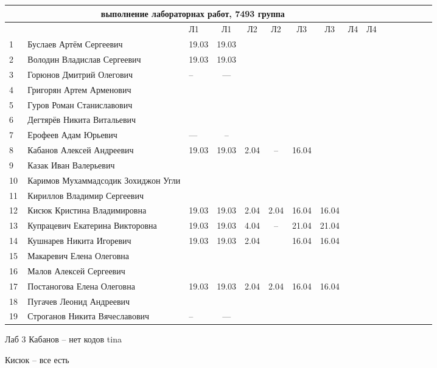 \documentclass[a4paper,11pt]{article}
\begin{document}
\newpage
%
\hspace{-2.1cm} %
\begin{tabular}{l|llccccccccccccc}
\multicolumn{10}{c}{выполнение лабораторнах работ, 7493 группа} \\
\toprule
&&Л1&Л1& Л2&Л2& Л3&Л3& Л4&Л4&\\ 
\midrule
1\,&Буслаев Артём Сергеевич               &19.03&19.03&&&&&&\\
2\,&Володин Владислав Сергеевич           &19.03&19.03&&&&&&\\
3\,&Горюнов Дмитрий Олегович              &--   &---   &&&&&&\\
4\,&Григорян Артем Арменович              &&&&&&&&\\
5\,&Гуров Роман Станиславович             &&&&&&&&\\
\midrule
6\,&Дегтярёв Никита Витальевич            &&&&&&&&\\
7\,&Ерофеев Адам Юрьевич                  &---&--&&&&&&\\
8\,&Кабанов Алексей Андреевич             &19.03&19.03&2.04&--&16.04&&&\\
9\,&Казак Иван Валерьевич                 &&&&&&&&\\
10\,&Каримов Мухаммадсодик Зохиджон Угли  &&&&&&&&\\
\midrule
11\,&Кириллов Владимир Сергеевич          &&&&&&&&\\
12\,&Кисюк Кристина Владимировна          &19.03&19.03&2.04 &2.04&16.04&16.04&&\\
13\,&Купрацевич Екатерина Викторовна      &19.03&19.03& 4.04& --  &21.04&21.04&&\\
14\,&Кушнарев Никита Игоревич             &19.03&19.03&2.04&&16.04&16.04&&\\
15\,&Макаревич Елена Олеговна             &&&&&&&&\\
\midrule
16\,&Малов Алексей Сергеевич              &&&&&&&&\\
17\,&Постаногова Елена Олеговна           &19.03&19.03&2.04&2.04&16.04&16.04&&\\
18\,&Пугачев Леонид Андреевич             &&&&&&&&\\
19\,&Строганов Никита Вячеславович        &--&---&&&&&&\\

\bottomrule
\end{tabular}

\newpage
Лаб 3
Кабанов -- нет кодов tina

Кисюк -- все есть
\end{document}
